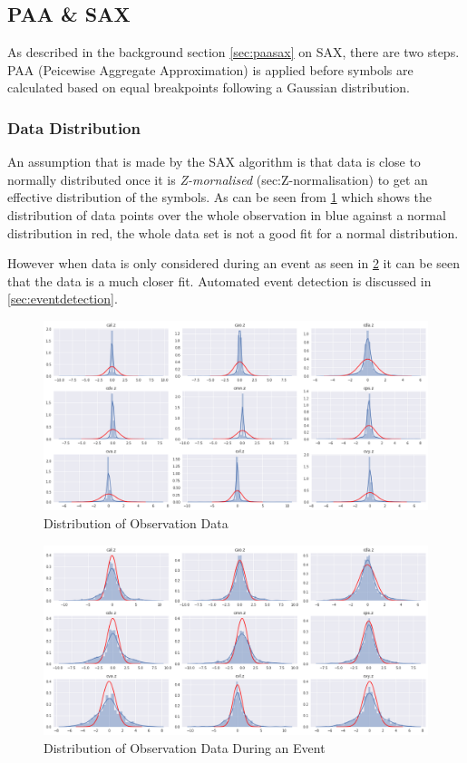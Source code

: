 \documentclass[../report.tex]{subfiles}
\begin{document}
\subsection{PAA \& SAX}
	As described in the background section \cref{sec:paasax} on SAX, there are two steps.  PAA (Peicewise Aggregate Approximation) is applied before symbols are calculated based on equal breakpoints following a Gaussian distribution.
	
\subsubsection{Data Distribution} \label{sec:distribution}
	An assumption that is made by the SAX algorithm is that data is close to normally distributed  once it is \textit{Z-mornalised} (sec:Z-normalisation) to get an effective distribution of the symbols.  As can be seen from \cref{fig:dist_obs} which shows the distribution of data points over the whole observation in blue against a normal distribution in red, the whole data set is not a good fit for a normal distribution.

	However when data is only considered during an event as seen in \cref{fig:dist_evt} it can be seen that the data is a much closer fit.  Automated event detection is discussed in \cref{sec:eventdetection}.
	
\begin{figure}[H]
	\centering
	\includegraphics[width=1\linewidth]{img/distribution_obs}
	\caption{Distribution of Observation Data}
	\label{fig:dist_obs}
\end{figure}

\begin{figure}[H]
	\centering
	\includegraphics[width=1\linewidth]{img/distribution_evt}
	\caption{Distribution of Observation Data During an Event}
	\label{fig:dist_evt}
\end{figure}
\end{document}
